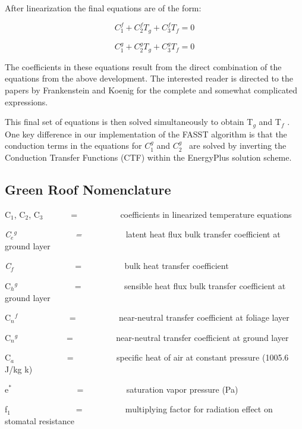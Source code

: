 After linearization the final equations are of the form:

\begin{equation}
C_1^f + C_2^f{T_g} + C_3^f{T_f} = 0
\end{equation}

\begin{equation}
C_1^g + C_2^g{T_g} + C_3^g{T_f} = 0
\end{equation}

The coefficients in these equations result from the direct combination of the equations from the above development. The interested reader is directed to the papers by Frankenstein and Koenig for the complete and somewhat complicated expressions.

This final set of equations is then solved simultaneously to obtain T\emph{\(_{g}\)} and T\emph{\(_{f}\)} . One key difference in our implementation of the FASST algorithm is that the conduction terms in the equations for \(C_1^g\) and \(C_2^g\) ~are solved by inverting the Conduction Transfer Functions (CTF) within the EnergyPlus solution scheme.

\subsection{Green Roof Nomenclature}\label{green-roof-nomenclature}

C\(_{1}\), C\(_{2}\), C\(_{3}\)~~~~~~ = ~~~~~~~~~ coefficients in linearized temperature equations

\emph{C\(_{e}\)\(^{g}\)~~~~~~~~~~~~~ = ~~~~~~~~~} latent heat flux bulk transfer coefficient at ground layer

\emph{C\(_{f}\)~~ ~~~~~~~~~~~} = ~~~~~~~~~ bulk heat transfer coefficient

C\(_{h}\)\(^{g}\)~~~~~~~~~~~~~ = ~~~~~~~~~ sensible heat flux bulk transfer coefficient at ground layer

C\(_{n}\)\(^{f}\) ~~~~~~~~~~~ = ~~~~~~~~~ near-neutral transfer coefficient at foliage layer

C\(_{n}\)\(^{g}\)~~~~~~~~~~~ = ~~~~~~~~~ near-neutral transfer coefficient at ground layer

C\(_{a}\)~~~~~~~~~~~~ = ~~~~~~~~~ specific heat of air at constant pressure (1005.6 J/kg k)

e\(^{*}\)~~~~~~~~~~~~~~~ = ~~~~~~~~~ saturation vapor pressure (Pa)

f\(_{1}\)~~~~~~~~~~~~~~~ = ~~~~~~~~~ multiplying factor for radiation effect on stomatal resistance

